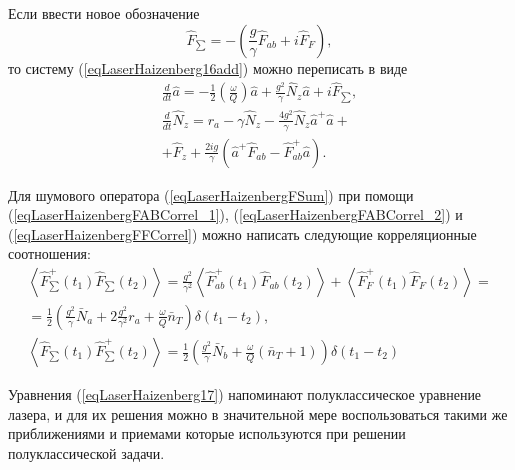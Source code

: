 Если ввести новое обозначение 
\begin{equation}
\hat{F}_{\sum} = - \left(\frac{g}{\gamma}\hat{F}_{ab} + i \hat{F}_F\right),
\label{eqLaserHaizenbergFSum}
\end{equation}
то систему 
(\ref{eqLaserHaizenberg16add}) можно переписать в виде
\begin{eqnarray}
\frac{d}{dt} \hat{a} = -
\frac{1}{2}\left(\frac{\omega}{Q}\right)\hat{a} + \frac{g^2}{\gamma}
\hat{N}_z\hat{a} + i \hat{F}_{\sum},
\nonumber \\
\frac{d}{dt}\hat{N}_z = r_a -
\gamma\hat{N}_z - \frac{4g^2}{\gamma}
\hat{N}_z\hat{a}^{+}\hat{a} +
\nonumber \\
+ \hat{F}_z + \frac{2ig}{\gamma} \left(\hat{a}^{+}\hat{F}_{ab} -
\hat{F}_{ab}^{+}\hat{a}\right).
\label{eqLaserHaizenberg17}
\end{eqnarray}

Для шумового оператора (\ref{eqLaserHaizenbergFSum}) при помощи
(\ref{eqLaserHaizenbergFABCorrel_1}),
(\ref{eqLaserHaizenbergFABCorrel_2}) и
(\ref{eqLaserHaizenbergFFCorrel}) 
можно написать следующие корреляционные соотношения:
\begin{eqnarray}
\left<\hat{F}^{+}_{\sum}\left(t_1\right)\hat{F}_{\sum}\left(t_2\right)\right>
=
\frac{g^2}{\gamma^2}\left<\hat{F}^{+}_{ab}\left(t_1\right)\hat{F}_{ab}\left(t_2\right)\right>
+
\left<\hat{F}^{+}_{F}\left(t_1\right)\hat{F}_{F}\left(t_2\right)\right>
= 
\nonumber \\
= 
\frac{1}{2}
\left(
\frac{g^2}{\gamma}\bar{N}_a + 2 \frac{g^2}{\gamma^2}r_a + 
\frac{\omega}{Q}\bar{n}_T
\right)
\delta\left(t_1 - t_2\right),
\nonumber \\
\left<\hat{F}_{\sum}\left(t_1\right)\hat{F}^{+}_{\sum}\left(t_2\right)\right>
= \frac{1}{2}
\left(
\frac{g^2}{\gamma}\bar{N}_b + 
\frac{\omega}{Q}\left(\bar{n}_T + 1\right)
\right)
\delta\left(t_1 - t_2\right)
\label{eqLaserHaizenbergFSumCorrel}
\end{eqnarray}


Уравнения (\ref{eqLaserHaizenberg17}) напоминают полуклассическое
уравнение лазера, и для их решения можно в значительной мере
воспользоваться такими же приближениями и приемами которые
используются при решении полуклассической задачи.





